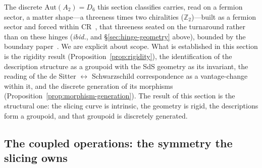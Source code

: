 \documentclass[11pt,a4paper]{article}
\theoremstyle{definition}
\begin{document}
The discrete $\mathrm{Aut}(A_{2})=D_{6}$ this section classifies carries, read on a fermion sector, a matter shape---a threeness times two chiralities ($\mathbb{Z}_{2}$)---built as a fermion sector and forced within CR~\cite{JanzenMatter}, that threeness seated on the turnaround rather than on these hinges (\emph{ibid.}, and \S\ref{sec:hinge-geometry} above), bounded by the boundary paper~\cite{JanzenBoundary}. We are explicit about scope. What is established in this section is the rigidity result (Proposition~\ref{prop:rigidity}), the identification of the description structure as a groupoid with the SdS geometry as its invariant, the reading of the de Sitter $\leftrightarrow$ Schwarzschild correspondence as a vantage-change within it, and the discrete generation of its morphisms (Proposition~\ref{prop:morphism-generation}). The result of this section is the structural one: the slicing curve is intrinsic, the geometry is rigid, the descriptions form a groupoid, and that groupoid is discretely generated.

\subsection{The coupled operations: the symmetry the slicing owns}\label{sec:coupled}
\end{document}
